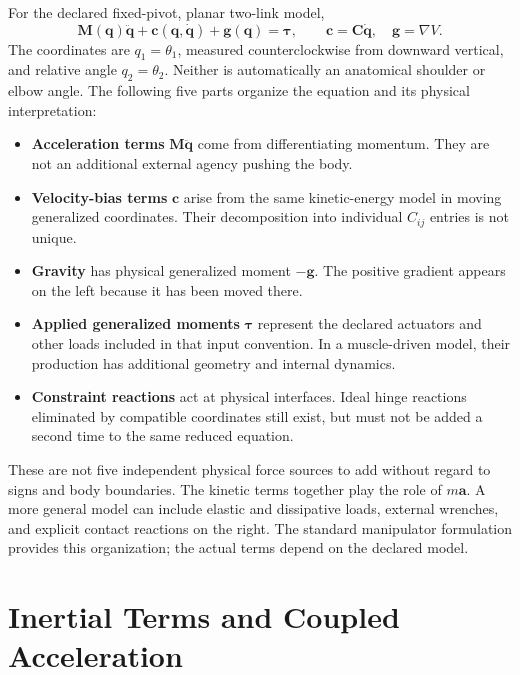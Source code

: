 For the declared fixed-pivot, planar two-link model,
\begin{equation}
\bm M(\bm q)\ddot{\bm q}+\bm c(\bm q,\dot{\bm q})+\bm g(\bm q)=\bm\tau,
\qquad \bm c=\bm C\dot{\bm q},\quad \bm g=\nabla V.
\label{eq:ch04_euler_lagrange}
\end{equation}
The coordinates are \(q_1=\theta_1\), measured counterclockwise from downward vertical, and relative angle \(q_2=\theta_2\). Neither is automatically an anatomical shoulder or elbow angle. The following five parts organize the equation and its physical interpretation:
\begin{itemize}
\item \textbf{Acceleration terms} \(\bm M\ddot{\bm q}\) come from differentiating momentum. They are not an additional external agency pushing the body.
\item \textbf{Velocity-bias terms} \(\bm c\) arise from the same kinetic-energy model in moving generalized coordinates. Their decomposition into individual \(C_{ij}\) entries is not unique.
\item \textbf{Gravity} has physical generalized moment \(-\bm g\). The positive gradient appears on the left because it has been moved there.
\item \textbf{Applied generalized moments} \(\bm\tau\) represent the declared actuators and other loads included in that input convention. In a muscle-driven model, their production has additional geometry and internal dynamics.
\item \textbf{Constraint reactions} act at physical interfaces. Ideal hinge reactions eliminated by compatible coordinates still exist, but must not be added a second time to the same reduced equation.
\end{itemize}

These are not five independent physical force sources to add without regard to signs and body boundaries. The kinetic terms together play the role of \(m\bm a\). A more general model can include elastic and dissipative loads, external wrenches, and explicit contact reactions on the right. The standard manipulator formulation provides this organization; the actual terms depend on the declared model. \citep{TedrakeMultibodyEnergy}

\section{Inertial Terms and Coupled Acceleration}

